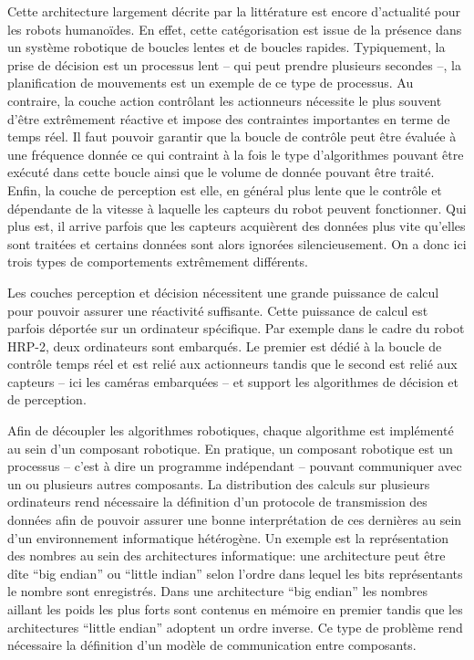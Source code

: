 Cette architecture largement décrite par la littérature est encore
d'actualité pour les robots humanoïdes. En effet, cette catégorisation
est issue de la présence dans un système robotique de boucles lentes
et de boucles rapides. Typiquement, la prise de décision est un
processus lent -- qui peut prendre plusieurs secondes --, la
planification de mouvements est un exemple de ce type de processus. Au
contraire, la couche action contrôlant les actionneurs nécessite le
plus souvent d'être extrêmement réactive et impose des contraintes
importantes en terme de temps réel. Il faut pouvoir garantir que la
boucle de contrôle peut être évaluée à une fréquence donnée ce qui
contraint à la fois le type d'algorithmes pouvant être exécuté dans
cette boucle ainsi que le volume de donnée pouvant être traité. Enfin,
la couche de perception est elle, en général plus lente que le
contrôle et dépendante de la vitesse à laquelle les capteurs du robot
peuvent fonctionner. Qui plus est, il arrive parfois que les capteurs
acquièrent des données plus vite qu'elles sont traitées et certains
données sont alors ignorées silencieusement. On a donc ici trois types
de comportements extrêmement différents.


Les couches perception et décision nécessitent une grande puissance de
calcul pour pouvoir assurer une réactivité suffisante. Cette puissance
de calcul est parfois déportée sur un ordinateur spécifique. Par
exemple dans le cadre du robot HRP-2, deux ordinateurs sont
embarqués. Le premier est dédié à la boucle de contrôle temps réel et
est relié aux actionneurs tandis que le second est relié aux capteurs
-- ici les caméras embarquées -- et support les algorithmes de
décision et de perception.


Afin de découpler les algorithmes robotiques, chaque algorithme est
implémenté au sein d'un composant robotique. En pratique, un composant
robotique est un processus -- c'est à dire un programme indépendant --
pouvant communiquer avec un ou plusieurs autres composants. La
distribution des calculs sur plusieurs ordinateurs rend nécessaire la
définition d'un protocole de transmission des données afin de pouvoir
assurer une bonne interprétation de ces dernières au sein d'un
environnement informatique hétérogène. Un exemple est la
représentation des nombres au sein des architectures informatique: une
architecture peut être dîte ``big endian'' ou ``little indian'' selon
l'ordre dans lequel les bits représentants le nombre sont
enregistrés. Dans une architecture ``big endian'' les nombres aillant
les poids les plus forts sont contenus en mémoire en premier tandis
que les architectures ``little endian'' adoptent un ordre inverse. Ce
type de problème rend nécessaire la définition d'un modèle de
communication entre composants.


